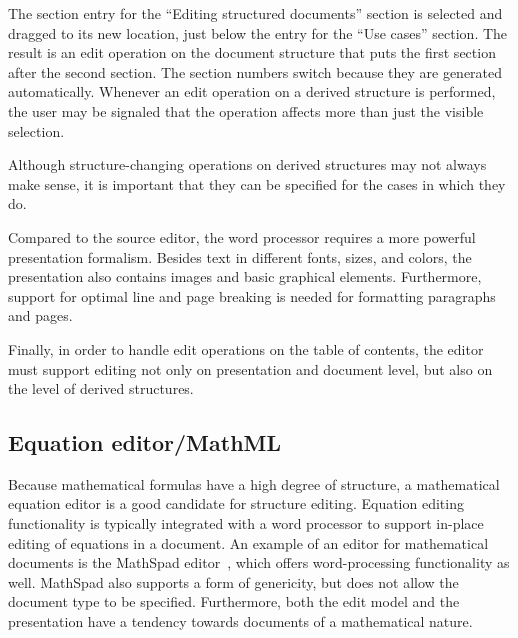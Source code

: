 \documentclass{entcs}
\begin{document}
The section entry for the ``Editing structured documents'' section is selected and dragged to its new location, just below the entry for the ``Use cases'' section. The result is an edit operation on the document structure that puts the first section after the second section. The section numbers switch because they are generated automatically. Whenever an edit operation on a derived structure is performed, the user may be signaled that the operation affects more than just the visible selection.

Although structure-changing operations on derived structures may not always make sense, it is important that they can be specified for the cases in which they do.


Compared to the source editor, the word processor requires a more powerful presentation formalism. Besides text in different fonts, sizes, and colors, the presentation also contains images and basic graphical elements. Furthermore, support for optimal line and page breaking is needed for formatting paragraphs and pages. 

Finally, in order to handle edit operations on the table of contents, the editor must support editing not only on presentation and document level, but also on the level of derived structures.


%																
\subsection{Equation editor/MathML}  

Because mathematical formulas have a high degree of structure, a mathematical equation editor is a good candidate for structure editing. Equation editing functionality is typically integrated with a word processor to support in-place editing of equations in a document. An example of an editor for mathematical documents is the MathSpad editor~\cite{verhoeven00mathspad}, which offers word-processing functionality as well. MathSpad also supports a form of genericity, but does not allow the document type to be specified. Furthermore, both the edit model and the presentation have a tendency towards documents of a mathematical nature.



\end{document}
